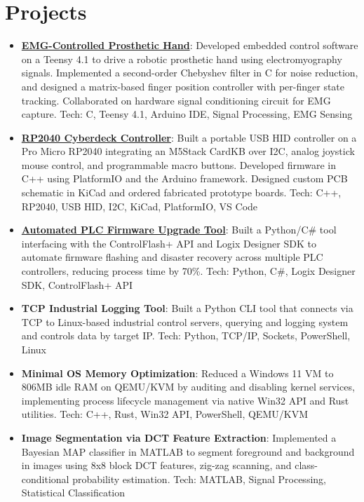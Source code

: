 \documentclass[a4paper,20pt]{article}
\newcommand{\resumeItem}[2]{
  \item\small{
    \textbf{#1}{: #2 \vspace{-2pt}}
  }
}
\newcommand{\resumeSubItem}[2]{\resumeItem{#1}{#2}\vspace{-4pt}}
\newcommand{\resumeSubHeadingListStart}{\begin{itemize}[leftmargin=*]}
\newcommand{\resumeSubHeadingListEnd}{\end{itemize}}
\begin{document}
\section{Projects}
\resumeSubHeadingListStart
\resumeSubItem{\href{https://github.com/juanrortiz/EMG-Controlled-Prosthetic}{EMG-Controlled Prosthetic Hand}}{Developed embedded control software on a Teensy 4.1 to drive a robotic prosthetic hand using electromyography signals. Implemented a second-order Chebyshev filter in C for noise reduction, and designed a matrix-based finger position controller with per-finger state tracking. Collaborated on hardware signal conditioning circuit for EMG capture. Tech: C, Teensy 4.1, Arduino IDE, Signal Processing, EMG Sensing}
\vspace{2pt}
\resumeSubItem{\href{https://github.com/juanrortiz/CyberDeck}{RP2040 Cyberdeck Controller}}{Built a portable USB HID controller on a Pro Micro RP2040 integrating an M5Stack CardKB over I2C, analog joystick mouse control, and programmable macro buttons. Developed firmware in C++ using PlatformIO and the Arduino framework. Designed custom PCB schematic in KiCad and ordered fabricated prototype boards. Tech: C++, RP2040, USB HID, I2C, KiCad, PlatformIO, VS Code}\vspace{2pt}
\vspace{2pt}
\resumeSubItem{\href{https://github.com/juanrortiz/Logix-Firmware-Manager}{Automated PLC Firmware Upgrade Tool}}{Built a Python/C\# tool interfacing with the ControlFlash+ API and Logix Designer SDK to automate firmware flashing and disaster recovery across multiple PLC controllers, reducing process time by 70\%. Tech: Python, C\#, Logix Designer SDK, ControlFlash+ API}
\vspace{2pt}
\resumeSubItem{TCP Industrial Logging Tool}{Built a Python CLI tool that connects via TCP to Linux-based industrial control servers, querying and logging system and controls data by target IP. Tech: Python, TCP/IP, Sockets, PowerShell, Linux}
\vspace{2pt}
\resumeSubItem{Minimal OS Memory Optimization}{Reduced a Windows 11 VM to 806MB idle RAM on QEMU/KVM by auditing and disabling kernel services, implementing process lifecycle management via native Win32 API and Rust utilities. Tech: C++, Rust, Win32 API, PowerShell, QEMU/KVM}
\vspace{2pt}
\resumeSubItem{Image Segmentation via DCT Feature Extraction}{Implemented a Bayesian MAP classifier in MATLAB to segment foreground and background in images using 8x8 block DCT features, zig-zag scanning, and class-conditional probability estimation. Tech: MATLAB, Signal Processing, Statistical Classification}
\resumeSubHeadingListEnd
\vspace{-2pt}
\end{document}
